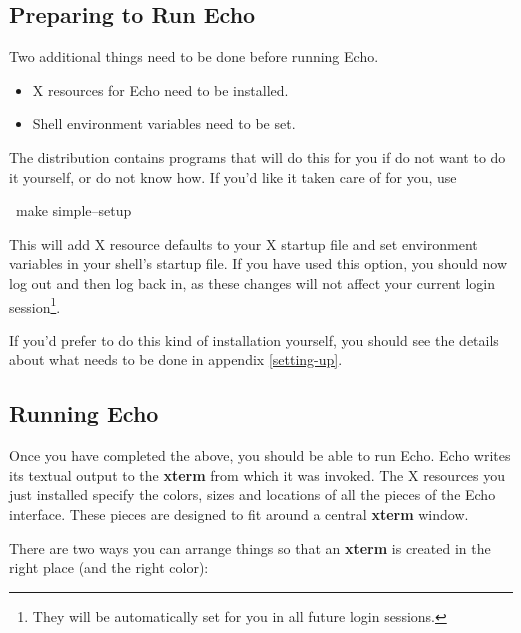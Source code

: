 \subsection{Preparing to Run Echo}

\label{simple-setup}

Two additional things need to be done before running Echo.

\begin{itemize}

\item
X resources for Echo need to be installed.

\item
Shell environment variables need to be set.

\end{itemize}

The distribution contains programs that will do this for you if do not
want to do it yourself, or do not know how. If you'd like it taken
care of for you, use

\begin{shell}
\prompt\ make simple--setup
\end{shell}

This will add X resource defaults to your X startup file and set
environment variables in your shell's startup file. If you have used
this option, you should now log out and then log back in, as these
changes will not affect your current login session\footnote{They will
be automatically set for you in all future login sessions.}.

If you'd prefer to do this kind of installation yourself, you should
see the details about what needs to be done in appendix \ref{setting-up}.


\subsection{Running Echo}
\label{running-echo}

Once you have completed the above, you should be able to run Echo.
Echo writes its textual output to the {\bf xterm} from which it was
invoked.  The X resources  you just installed
specify the colors, sizes and locations of all the pieces of the Echo
interface.  These pieces are designed to fit around a central {\bf
xterm} window.

There are two ways you can arrange things so that an {\bf xterm} is
created in the right place (and the right color):

